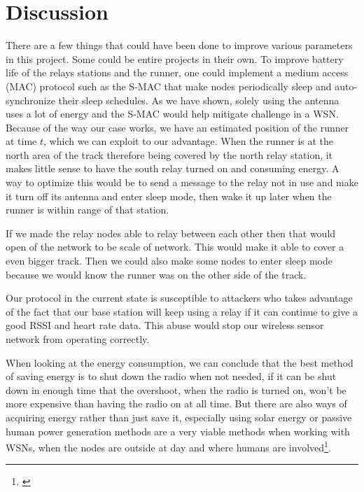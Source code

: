 \section{Discussion}

There are a few things that could have been done to improve various parameters in this project. Some could be entire projects in their own. To improve battery life of the relays stations and the runner, one could implement a medium access (MAC) protocol such as the S-MAC that make nodes periodically sleep and auto-synchronize their sleep schedules. As we have shown, solely using the antenna uses a lot of energy and the S-MAC would help mitigate challenge in a WSN. Because of the way our case works, we have an estimated position of the runner at time $t$, which we can exploit to our advantage. When the runner is at the north area of the track therefore being covered by the north relay station, it makes little sense to have the south relay turned on and consuming energy. A way to optimize this would be to send a message to the relay not in use and make it turn off its antenna and enter sleep mode, then wake it up later when the runner is within range of that station.

\noindent If we made the relay nodes able to relay between each other then that would open of the network to be scale of network. This would make it able to cover a even bigger track. Then we could also make some nodes to enter sleep mode because we would know the runner was on the other side of the track.

\noindent Our protocol in the current state is susceptible to attackers who takes advantage of the fact that our base station will keep using a relay if it can continue to give a good RSSI and heart rate data. This abuse would stop our wireless sensor network from operating correctly.

\noindent When looking at the energy consumption, we can conclude that the best method of saving energy is to shut down the radio when not needed, if it can be shut down in enough time that the overshoot, when the radio is turned on, won't be more expensive than having the radio on at all time. But there are also ways of acquiring energy rather than just save it, especially using solar energy or passive human power generation methods are a very viable methods when working with WSNs, when the nodes are outside at day and where humans are involved\footnote{\cite{Sudevalayam2011}}.